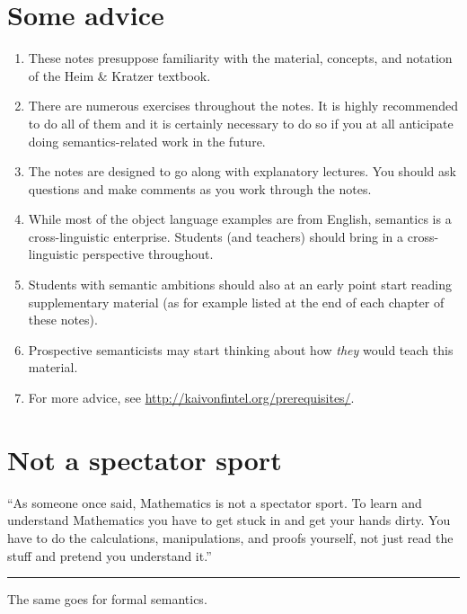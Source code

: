\section*{Some advice}
\begin{enumerate}
\item These notes presuppose familiarity with the material, concepts, and
  notation of the Heim \& Kratzer textbook.
\item There are numerous exercises throughout the notes. It is highly
  recommended to do all of them and it is certainly necessary to do so if you at
  all anticipate doing semantics-related work in the future.
\item The notes are designed to go along with explanatory lectures. You should
  ask questions and make comments as you work through the notes.
\item While most of the object language examples are from English, semantics is
  a cross-linguistic enterprise. Students (and teachers) should bring in a
  cross-linguistic perspective throughout.
\item Students with semantic ambitions should also at an early point start
  reading supplementary material (as for example listed at the end of each
  chapter of these notes).
\item Prospective semanticists may start thinking about how \emph{they} would
  teach this material.
\item For more advice, see \url{http://kaivonfintel.org/prerequisites/}.
\end{enumerate}

\section*{Not a spectator sport}

%
``As someone once said, Mathematics is not a spectator sport. To learn and understand Mathematics you
have to get stuck in and get your hands dirty. You have to do the calculations,
manipulations, and proofs yourself, not just read the stuff and pretend you
understand it.''

\plainbreak{1}

The same goes for formal semantics.

\cleartooddpage

\tableofcontents*

\pagestyle{tufte-headings}

